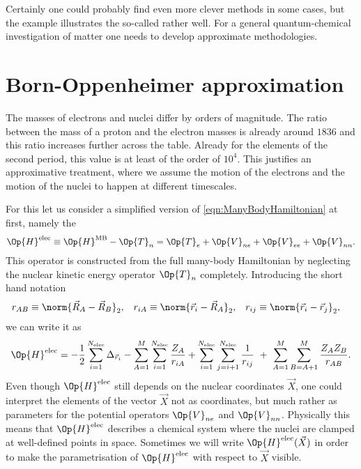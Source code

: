 Certainly one could probably find even more clever methods in some cases,
but the example illustrates the so-called  rather well.
For a general quantum-chemical investigation of matter
one needs to develop approximate methodologies.

\section{Born-Oppenheimer approximation}
\label{sec:BO}
The masses of electrons and nuclei differ by orders of magnitude.
The ratio between the mass of a proton and the electron masses
is already around $1836$ and this ratio increases
further across the table.
Already for the elements of the second period,
this value is at least of the order of $10^4$.
This justifies an approximative treatment,
where we assume the motion of the electrons
and the motion of the nuclei to happen at different timescales.

For this let us consider
a simplified version of \eqref{eqn:ManyBodyHamiltonian} at first,
namely the 
\[
	\Op{H}^\text{elec} \equiv \Op{H}^\text{MB} - \Op{T}_n
	= \Op{T}_e + \Op{V}_{ne} + \Op{V}_{ee} + \Op{V}_{nn}.
\]
This operator is constructed from the full many-body Hamiltonian
by neglecting the nuclear kinetic energy operator $\Op{T}_n$ completely.
Introducing the short hand notation
\begin{align*}
r_{AB} &\equiv \norm{\vec{R}_A - \vec{R}_B}_2, &
r_{iA} &\equiv \norm{\vec{r}_i - \vec{R}_A}_2, &
r_{ij} &\equiv \norm{\vec{r}_i - \vec{r}_j}_2, &
\end{align*}
we can write it as
\begin{equation}
	\Op{H}^\text{elec}
	= - \frac12 \sum_{i=1}^{\Nelec} \Delta_{\vec{r}_i}
	- \sum_{A=1}^M \sum_{i=1}^{\Nelec} \frac{Z_A}{r_{iA}}
	+ \sum_{i=1}^{\Nelec} \sum_{j=i+1}^{\Nelec} \frac{1}{r_{ij}}
	\  + \  %
	\sum_{A=1}^{M} \sum_{B=A+1}^{M} \frac{Z_A Z_B}{r_{AB}}.
	\label{eqn:ElectronicFullHamiltonian}
\end{equation}
Even though $\Op{H}^\text{elec}$ still depends on the nuclear coordinates $\vec{X}$,
one could interpret the elements of the vector
$\vec{X}$ not as coordinates,
but much rather as parameters for the potential operators $\Op{V}_{ne}$ and $\Op{V}_{nn}$.
Physically this means that $\Op{H}^\text{elec}$ describes a chemical system
where the nuclei are clamped at well-defined points in space.
Sometimes we will write $\Op{H}^\text{elec}(\vec{X})$
in order to make the parametrisation of $\Op{H}^\text{elec}$ with respect to $\vec{X}$
visible.

